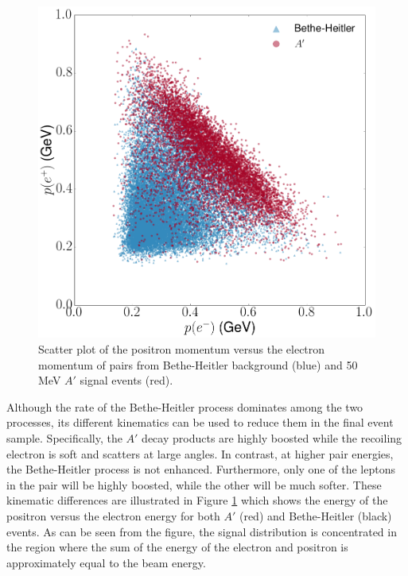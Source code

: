 \begin{figure}[ht]
    \centering
    \includegraphics[width=.8\textwidth]{images/bh_energy_cut.png}
    \caption{Scatter plot of the positron momentum versus the electron momentum 
             of pairs from Bethe-Heitler background (blue) and 50 MeV $A'$
             signal events (red).}
    \label{fig:ap_v_bethe}
\end{figure}
Although the rate of the Bethe-Heitler process dominates among the two 
processes, its different kinematics can be used to reduce them in the final 
event sample.  Specifically, the $A'$ decay products are highly boosted while 
the recoiling electron is soft and scatters at large angles.  In contrast, 
at higher pair energies, the Bethe-Heitler process is not enhanced.  Furthermore,
only one of the leptons in the pair will be highly boosted, while the other
will be much softer.  
These kinematic differences are illustrated in Figure \ref{fig:ap_v_bethe} which
shows the energy of the positron versus the electron energy for both $A'$ (red)
and Bethe-Heitler (black) events.  As can be seen from the figure, the signal
distribution is concentrated in the region where the sum of the energy of the
electron and positron is approximately equal to the beam energy.


